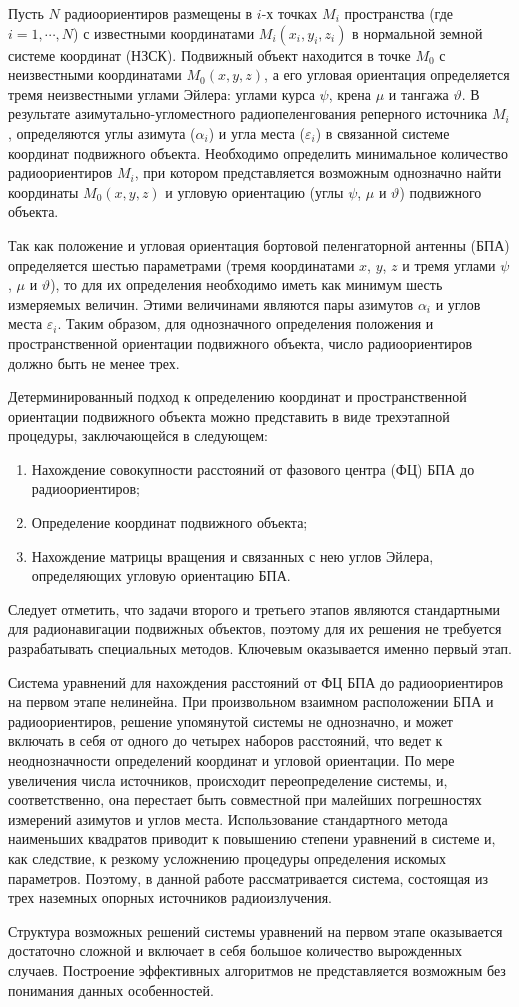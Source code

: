 \documentclass[../main.tex]{subfiles}
\begin{document}
Пусть $N$ радиоориентиров размещены в $i$-х точках $M_i$ пространства (где $i = 1, \cdots, N$) с известными
координатами $M_i\left(x_i, y_i, z_i\right)$ в нормальной земной системе координат (НЗСК). Подвижный объект
находится в точке $M_0$ с неизвестными координатами $M_0\left(x, y, z\right)$, а его угловая ориентация
определяется тремя неизвестными углами Эйлера: углами курса $\psi$, крена $\mu$ и тангажа $\vartheta$.
В результате азимутально-угломестного радиопеленгования реперного источника $M_i$, определяются углы
азимута ($\alpha_i$) и угла места ($\varepsilon_i$) в связанной системе координат подвижного объекта. Необходимо
определить минимальное количество радиоориентиров $M_i$, при котором представляется возможным однозначно найти
координаты $M_0\left(x, y, z\right)$ и угловую ориентацию (углы $\psi$, $\mu$ и $\vartheta$) подвижного
объекта.

Так как положение и угловая ориентация бортовой пеленгаторной антенны (БПА) определяется шестью параметрами
(тремя координатами $x$, $y$, $z$ и тремя углами $\psi$, $\mu$ и $\vartheta$), то для их определения необходимо
иметь как минимум шесть измеряемых величин. Этими величинами являются пары азимутов $\alpha_i$ и углов места
$\varepsilon_i$. Таким образом, для однозначного определения положения и пространственной ориентации подвижного
объекта, число радиоориентиров должно быть не менее трех.

Детерминированный подход к определению координат и пространственной ориентации подвижного объекта можно представить
в виде трехэтапной процедуры, заключающейся в следующем:
\begin{enumerate}
    \item Нахождение совокупности расстояний от фазового центра (ФЦ) БПА до радиоориентиров;
    \item Определение координат подвижного объекта;
    \item Нахождение матрицы вращения и связанных с нею углов Эйлера, определяющих угловую ориентацию БПА.
\end{enumerate}

Следует отметить, что задачи второго и третьего этапов являются стандартными для радионавигации подвижных объектов,
поэтому для их решения не требуется разрабатывать специальных методов. Ключевым оказывается именно первый этап.

Система уравнений для нахождения расстояний от ФЦ БПА до радиоориентиров на первом этапе нелинейна. При произвольном взаимном
расположении БПА и радиоориентиров, решение упомянутой системы не однозначно, и может включать в себя от одного
до четырех наборов расстояний, что ведет к неоднозначности определений координат и угловой ориентации. По мере увеличения
числа источников, происходит переопределение системы, и, соответственно, она перестает быть совместной при малейших
погрешностях измерений азимутов и углов места. Использование стандартного метода наименьших квадратов приводит к повышению
степени уравнений в системе и, как следствие, к резкому усложнению процедуры определения искомых параметров. Поэтому, в данной
работе рассматривается система, состоящая из трех наземных опорных источников радиоизлучения.

Структура возможных решений системы уравнений на первом этапе оказывается достаточно сложной и включает в себя большое
количество вырожденных случаев. Построение эффективных алгоритмов не представляется возможным без понимания данных
особенностей.
\end{document}
